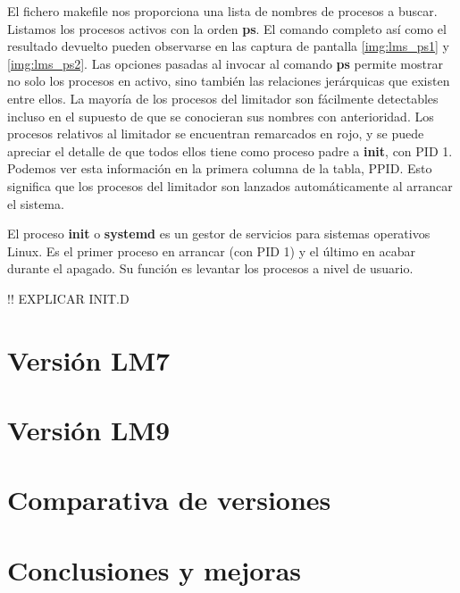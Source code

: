 El fichero \gls{makefile} nos proporciona una lista de nombres de procesos a buscar. Listamos los procesos activos con la orden \textbf{ps}. El comando completo así como el resultado devuelto pueden observarse en las captura de pantalla \ref{img:lms_ps1} y \ref{img:lms_ps2}. Las opciones pasadas al invocar al comando \textbf{ps} permite mostrar no solo los procesos en activo, sino también las relaciones jerárquicas que existen entre ellos. La mayoría de los procesos del limitador son fácilmente detectables incluso en el supuesto de que se conocieran sus nombres con anterioridad. Los procesos relativos al limitador se encuentran remarcados en rojo, y se puede apreciar el detalle de que todos ellos tiene como proceso padre  a \textbf{init}, con \acrshort{PID} 1. Podemos ver esta información en la primera columna de la tabla, \acrshort{PPID}. Esto significa que los procesos del limitador son lanzados automáticamente al arrancar el sistema.

\begin{shaded}
    \noindent
    El proceso \textbf{init} o \textbf{systemd} es un gestor de servicios para sistemas operativos Linux. Es el primer proceso en arrancar (con \acrshort{PID} 1) y el último en acabar durante el apagado. Su función es levantar los procesos a nivel de usuario.
\end{shaded}

!! EXPLICAR INIT.D

\section{Versión LM7}   \label{sec:lms7}

\section{Versión LM9}   \label{sec:lms9}

\section{Comparativa de versiones}  \label{sec:lms7-9}

\section{Conclusiones y mejoras}    \label{sec:ii-conclusiones}

